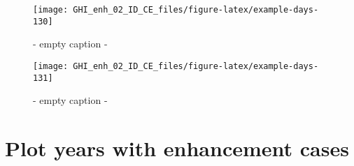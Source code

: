 \documentclass[
  10pt,
  a4paper,oneside]{article}
\begin{document}
\begin{figure}[H]

{\centering \texttt{[image: GHI\_enh\_02\_ID\_CE\_files/figure-latex/example-days-130]} 

}

\caption{ - empty caption - }\label{fig:example-days-130}
\end{figure}

\begin{figure}[H]

{\centering \texttt{[image: GHI\_enh\_02\_ID\_CE\_files/figure-latex/example-days-131]} 

}

\caption{ - empty caption - }\label{fig:example-days-131}
\end{figure}

\newpage
\FloatBarrier

\hypertarget{plot-years-with-enhancement-cases}{%
\section{Plot years with enhancement cases}\label{plot-years-with-enhancement-cases}}
\end{document}
